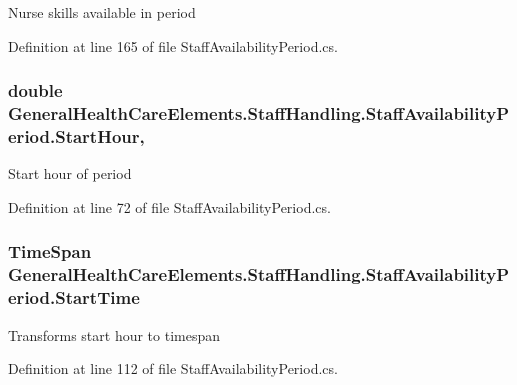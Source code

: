 Nurse skills available in period 



Definition at line 165 of file Staff\+Availability\+Period.\+cs.

\subsubsection[{\texorpdfstring{Start\+Hour}{StartHour}}]{\setlength{\rightskip}{0pt plus 5cm}double General\+Health\+Care\+Elements.\+Staff\+Handling.\+Staff\+Availability\+Period.\+Start\+Hour\hspace{0.3cm}{\ttfamily [get]}, {\ttfamily [set]}}\hypertarget{class_general_health_care_elements_1_1_staff_handling_1_1_staff_availability_period_a1d99b3dbefe37ef8875ecded198eb6cf}{}\label{class_general_health_care_elements_1_1_staff_handling_1_1_staff_availability_period_a1d99b3dbefe37ef8875ecded198eb6cf}


Start hour of period 



Definition at line 72 of file Staff\+Availability\+Period.\+cs.

\subsubsection[{\texorpdfstring{Start\+Time}{StartTime}}]{\setlength{\rightskip}{0pt plus 5cm}Time\+Span General\+Health\+Care\+Elements.\+Staff\+Handling.\+Staff\+Availability\+Period.\+Start\+Time\hspace{0.3cm}{\ttfamily [get]}}\hypertarget{class_general_health_care_elements_1_1_staff_handling_1_1_staff_availability_period_acb352568b972d833fd05150a1aee09d3}{}\label{class_general_health_care_elements_1_1_staff_handling_1_1_staff_availability_period_acb352568b972d833fd05150a1aee09d3}


Transforms start hour to timespan 



Definition at line 112 of file Staff\+Availability\+Period.\+cs.

